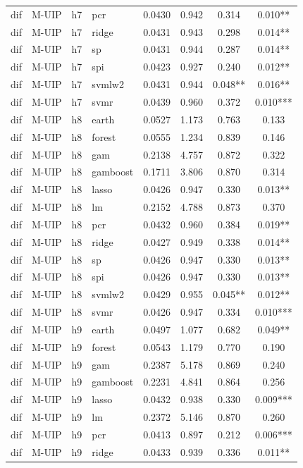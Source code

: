 \begin{ThreePartTable}
\begin{longtable}[t]{llclcccc}
dif & M-UIP & h7 & pcr & 0.0430 & 0.942 & 0.314 & 0.010**\\
dif & M-UIP & h7 & ridge & 0.0431 & 0.943 & 0.298 & 0.014**\\
dif & M-UIP & h7 & sp & 0.0431 & 0.944 & 0.287 & 0.014**\\
dif & M-UIP & h7 & spi & 0.0423 & 0.927 & 0.240 & 0.012**\\
dif & M-UIP & h7 & svmlw2 & 0.0431 & 0.944 & 0.048** & 0.016**\\
dif & M-UIP & h7 & svmr & 0.0439 & 0.960 & 0.372 & 0.010***\\
\addlinespace
dif & M-UIP & h8 & earth & 0.0527 & 1.173 & 0.763 & 0.133\\
dif & M-UIP & h8 & forest & 0.0555 & 1.234 & 0.839 & 0.146\\
dif & M-UIP & h8 & gam & 0.2138 & 4.757 & 0.872 & 0.322\\
dif & M-UIP & h8 & gamboost & 0.1711 & 3.806 & 0.870 & 0.314\\
dif & M-UIP & h8 & lasso & 0.0426 & 0.947 & 0.330 & 0.013**\\
dif & M-UIP & h8 & lm & 0.2152 & 4.788 & 0.873 & 0.370\\
dif & M-UIP & h8 & pcr & 0.0432 & 0.960 & 0.384 & 0.019**\\
dif & M-UIP & h8 & ridge & 0.0427 & 0.949 & 0.338 & 0.014**\\
dif & M-UIP & h8 & sp & 0.0426 & 0.947 & 0.330 & 0.013**\\
dif & M-UIP & h8 & spi & 0.0426 & 0.947 & 0.330 & 0.013**\\
dif & M-UIP & h8 & svmlw2 & 0.0429 & 0.955 & 0.045** & 0.012**\\
dif & M-UIP & h8 & svmr & 0.0426 & 0.947 & 0.334 & 0.010***\\
\addlinespace
dif & M-UIP & h9 & earth & 0.0497 & 1.077 & 0.682 & 0.049**\\
dif & M-UIP & h9 & forest & 0.0543 & 1.179 & 0.770 & 0.190\\
dif & M-UIP & h9 & gam & 0.2387 & 5.178 & 0.869 & 0.240\\
dif & M-UIP & h9 & gamboost & 0.2231 & 4.841 & 0.864 & 0.256\\
dif & M-UIP & h9 & lasso & 0.0432 & 0.938 & 0.330 & 0.009***\\
dif & M-UIP & h9 & lm & 0.2372 & 5.146 & 0.870 & 0.260\\
dif & M-UIP & h9 & pcr & 0.0413 & 0.897 & 0.212 & 0.006***\\
dif & M-UIP & h9 & ridge & 0.0433 & 0.939 & 0.336 & 0.011**\\

\end{longtable}
\end{ThreePartTable}
